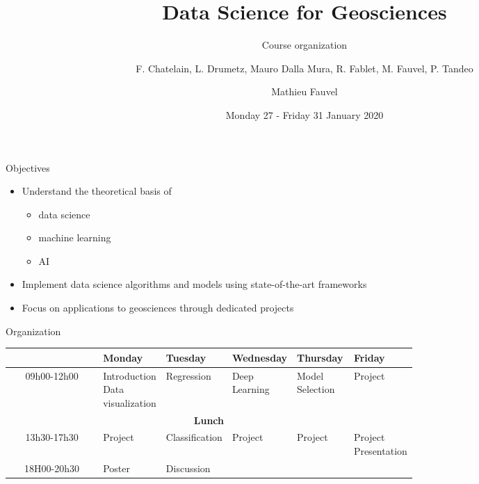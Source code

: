 \documentclass[pressentation,10pt,aspectratio=1610, xcolor=table]{beamer}
\author{F. Chatelain, L. Drumetz, Mauro Dalla Mura, R. Fablet, M. Fauvel, P. Tandeo}
\date{Monday 27 - Friday 31 January 2020}
\title{Data Science for Geosciences}
\subtitle{Course organization}
\author[Mathieu Fauvel]{Mathieu Fauvel}
\begin{document}
\maketitle

\begin{frame}[label={sec:org3a20624}]{Objectives}
\begin{itemize}
\item Understand the theoretical basis of 
\begin{itemize}
\item data science
\item machine learning
\item AI
\end{itemize}
\item Implement data science algorithms and models using state-of-the-art frameworks
\item Focus on applications to geosciences through dedicated projects
\end{itemize}
\end{frame}

\begin{frame}[label={sec:org510cbcc}]{Organization}
\footnotesize
\begin{center}
\begin{tabular}{cp{0.15\linewidth}p{0.13\linewidth}p{0.13\linewidth}p{0.14\linewidth}p{0.13\linewidth}}
\toprule
 & Monday & Tuesday & Wednesday & Thursday & Friday\\
\midrule
09h00-12h00 & Introduction \newline Data visualization & Regression & Deep Learning & Model Selection & Project\\
\midrule
\multicolumn{6}{c}{\bf Lunch}\\
\midrule
13h30-17h30 & Project & Classification & Project & Project & Project \newline Presentation\\
\midrule
18H00-20h30 & Poster & Discussion &  &  & \\
\bottomrule
\end{tabular}
\end{center}
\normalfont
\end{frame}
\end{document}
